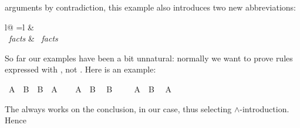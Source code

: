 \begin{isabellebody}
\begin{isamarkuptext}
arguments by contradiction, this example also introduces two new
abbreviations:
\begin{center}
\begin{tabular}{l@ {\quad=\quad}l}
 &   \\
~\emph{facts} &
~\emph{facts} 
\end{tabular}
\end{center}%
\end{isamarkuptext}%
\isamarkuptrue%
%
\isamarkuptrue%
%
\begin{isamarkuptext}%
So far our examples have been a bit unnatural: normally we want to
prove rules expressed with , not . Here is an example:%
\end{isamarkuptext}%
\isamarkuptrue%
\isamarkupfalse%
\ {}A\ {}\ B\ {}\ B\ {}\ A{}\isanewline
%
\isadelimproof
%
\endisadelimproof
%
\isatagproof
{}\isamarkupfalse%
\isanewline
\ \ \isamarkupfalse%
\ {}A\ {}\ B{}\ \isamarkupfalse%
\ {}B{}\ \isamarkupfalse%
\isanewline
{}\isamarkupfalse%
\isanewline
\ \ \isamarkupfalse%
\ {}A\ {}\ B{}\ \isamarkupfalse%
\ {}A{}\ \isamarkupfalse%
\isanewline
{}\isamarkupfalse%
%
\endisatagproof
{\isafoldproof}%
%
\isadelimproof
%
\endisadelimproof
%
\begin{isamarkuptext}%
\noindent The  always works on the conclusion,
 in our case, thus selecting $\land$-introduction. Hence

\end{isamarkuptext}
\end{isabellebody}
